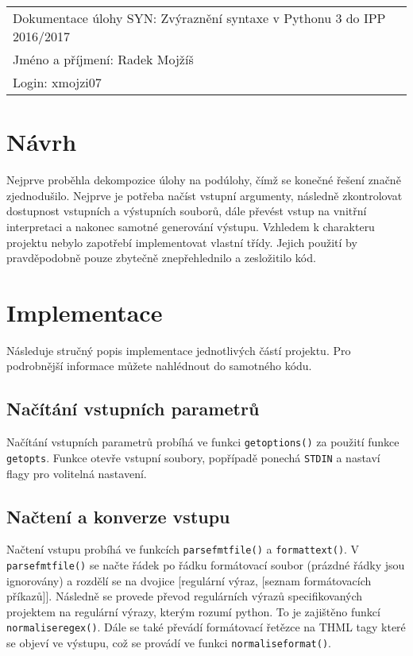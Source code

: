 \documentclass[a4paper, 10pt]{article}
\begin{document}
\begin{flushleft}
\begin{large}
\begin{tabular}{ll}
  Dokumentace úlohy SYN: Zvýraznění syntaxe v Pythonu 3 do IPP 2016/2017\\
  Jméno a příjmení: Radek Mojžíš\\
  Login: xmojzi07\\
\end{tabular}
\end{large}
\end{flushleft}
\section{Návrh}
Nejprve proběhla dekompozice úlohy na podúlohy, čímž se konečné řešení
značně zjednodušilo. Nejprve je potřeba načíst vstupní argumenty, následně
zkontrolovat dostupnost vstupních a výstupních souborů, dále převést vstup
na vnitřní interpretaci a nakonec samotné generování výstupu. Vzhledem k charakteru projektu nebylo zapotřebí implementovat vlastní třídy. Jejich použití by pravděpodobně pouze zbytečně znepřehlednilo a zesložitilo kód.
\section{Implementace}
Následuje stručný popis implementace jednotlivých částí projektu. Pro podrobnější informace můžete nahlédnout do samotného kódu. 

\subsection{Načítání vstupních parametrů}
Načítání vstupních parametrů probíhá ve funkci \texttt{geto\textunderscore ptions()}
za použití funkce \texttt{getopts}. Funkce otevře vstupní soubory, 
popřípadě ponechá \texttt{STDIN} a nastaví flagy pro volitelná nastavení.

\subsection{Načtení a konverze vstupu}
Načtení vstupu probíhá ve funkcích \texttt{parse\textunderscore fmt\textunderscore file()} a \texttt{format\textunderscore text()}.
V \texttt{parse\textunderscore fmt\textunderscore file()} se načte řádek po řádku formátovací soubor (prázdné řádky jsou ignorovány)
a rozdělí se na dvojice [regulární výraz, [seznam formátovacích příkazů]].
Následně se provede převod regulárních výrazů specifikovaných projektem na 
regulární výrazy, kterým rozumí python. To je zajištěno funkcí \texttt{normalise\textunderscore regex()}. Dále se také převádí formátovací řetězce na
THML tagy které se objeví ve výstupu, což se provádí ve funkci \texttt{normalise\textunderscore format()}.
\end{document}
